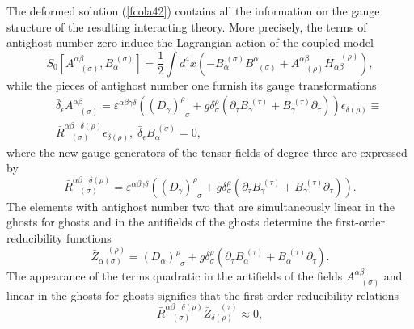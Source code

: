 \documentclass[a4paper,12pt]{article}
\begin{document}
The deformed solution (\ref{fcola42}) contains all the information on the
gauge structure of the resulting interacting theory. More precisely, the
terms of antighost number zero induce the Lagrangian action of the coupled
model 
\begin{equation}
\bar{S}_{0}\left[ A_{\;\;\;(\sigma )}^{\alpha \beta },B_{\alpha }^{\;(\sigma
)}\right] =\frac{1}{2}\int d^{4}x\left( -B_{\alpha }^{\;(\sigma
)}B_{\;\;(\sigma )}^{\alpha }+A_{\;\;\;(\rho )}^{\alpha \beta }\bar{H}%
_{\alpha \beta }^{\;\;\;(\rho )}\right) ,  \label{fcola45}
\end{equation}
while the pieces of antighost number one furnish its gauge transformations 
\begin{eqnarray}
&&\bar{\delta}_{\epsilon }A_{\;\;\;(\sigma )}^{\alpha \beta }=\varepsilon
^{\alpha \beta \gamma \delta }\left( \left( D_{\gamma }\right) _{\;\;\sigma
}^{\rho }+g\delta _{\sigma }^{\rho }\left( \partial _{\tau }B_{\gamma
}^{\;(\tau )}+B_{\gamma }^{\;(\tau )}\partial _{\tau }\right) \right)
\epsilon _{\delta (\rho )}\equiv  \nonumber \\
&&\bar{R}_{\;\;\;(\sigma )}^{\alpha \beta \;\;\;\delta (\rho )}\epsilon
_{\delta (\rho )},\;\bar{\delta}_{\epsilon }B_{\alpha }^{\;(\sigma )}=0,
\label{fcola46}
\end{eqnarray}
where the new gauge generators of the tensor fields of degree three are
expressed by 
\begin{equation}
\bar{R}_{\;\;\;(\sigma )}^{\alpha \beta \;\;\;\delta (\rho )}=\varepsilon
^{\alpha \beta \gamma \delta }\left( \left( D_{\gamma }\right) _{\;\;\sigma
}^{\rho }+g\delta _{\sigma }^{\rho }\left( \partial _{\tau }B_{\gamma
}^{\;(\tau )}+B_{\gamma }^{\;(\tau )}\partial _{\tau }\right) \right) .
\label{fcola46a}
\end{equation}
The elements with antighost number two that are simultaneously linear in the
ghosts for ghosts and in the antifields of the ghosts determine the
first-order reducibility functions 
\begin{equation}
\bar{Z}_{\alpha (\sigma )}^{\;\;\;\;(\rho )}=\left( D_{\alpha }\right)
_{\;\;\sigma }^{\rho }+g\delta _{\sigma }^{\rho }\left( \partial _{\tau
}B_{\alpha }^{\;(\tau )}+B_{\alpha }^{\;(\tau )}\partial _{\tau }\right) .
\label{fcola47}
\end{equation}
The appearance of the terms quadratic in the antifields of the fields $%
A_{\;\;\;(\sigma )}^{\alpha \beta }$ and linear in the ghosts for ghosts
signifies that the first-order reducibility relations 
\begin{equation}
\bar{R}_{\;\;\;(\sigma )}^{\alpha \beta \;\;\;\delta (\rho )}\bar{Z}_{\delta
(\rho )}^{\;\;\;\;(\tau )}\approx 0,  \label{fcola48}
\end{equation}
\end{document}
